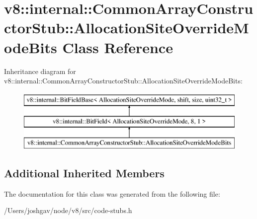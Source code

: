 \hypertarget{classv8_1_1internal_1_1_common_array_constructor_stub_1_1_allocation_site_override_mode_bits}{}\section{v8\+:\+:internal\+:\+:Common\+Array\+Constructor\+Stub\+:\+:Allocation\+Site\+Override\+Mode\+Bits Class Reference}
\label{classv8_1_1internal_1_1_common_array_constructor_stub_1_1_allocation_site_override_mode_bits}
Inheritance diagram for v8\+:\+:internal\+:\+:Common\+Array\+Constructor\+Stub\+:\+:Allocation\+Site\+Override\+Mode\+Bits\+:\begin{figure}[H]
\begin{center}
\leavevmode
\includegraphics[height=3.000000cm]{classv8_1_1internal_1_1_common_array_constructor_stub_1_1_allocation_site_override_mode_bits}
\end{center}
\end{figure}
\subsection*{Additional Inherited Members}


The documentation for this class was generated from the following file\+:\begin{DoxyCompactItemize}
\item 
/\+Users/joshgav/node/v8/src/code-\/stubs.\+h\end{DoxyCompactItemize}
